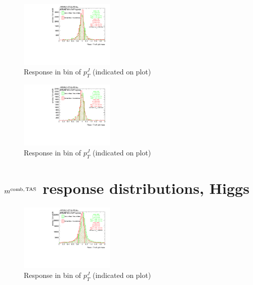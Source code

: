 \begin{figure}

\includegraphics[width=0.4\textwidth]{appendixB/mTASCOMB_Tops_calibmCal_030ro_20:20:52-03-11-2016/8ResponsePTJ_h_JetRatio_mJ11CALO.pdf}
\caption{Response in bin of  $p_{T}^{J}$ (indicated on plot)} 

\end{figure}

\begin{figure}

\includegraphics[width=0.4\textwidth]{appendixB/mTASCOMB_Tops_calibmCal_030ro_20:20:52-03-11-2016/8ResponsePTJ_h_JetRatio_mJ12CALO.pdf}
\caption{Response in bin of  $p_{T}^{J}$ (indicated on plot)} 

\end{figure}
\clearpage
\onecolumn
\vspace*{\fill}
\section{$m^\textrm{comb,\,TAS}$ response distributions, Higgs}
\vfill
\clearpage
\twocolumn
 \clearpage %
\begin{figure}

\includegraphics[width=0.4\textwidth]{appendixB/mTAS_Comb_Higgs_calibmCal_003ro_11:11:35-10-11-2016/8ResponsePTJ_h_JetRatio_mJ01CALO.pdf}
\caption{Response in bin of  $p_{T}^{J}$ (indicated on plot)} 

\end{figure}


